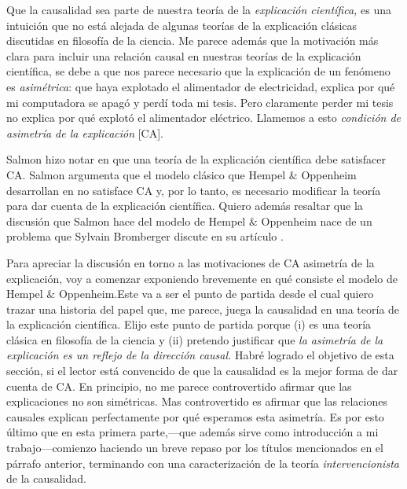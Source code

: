 Que la causalidad sea parte de nuestra teoría de la
\emph{explicación científica,} es una intuición que no
está alejada de algunas teorías de la explicación
clásicas discutidas en filosofía de la ciencia. Me
parece además que la motivación más clara para incluir
una relación causal en nuestras teorías de la
explicación científica, se debe a que nos parece
necesario que la explicación de un fenómeno es \emph{
asimétrica}: que haya explotado el alimentador de
electricidad, explica por qué mi computadora se apagó
y perdí toda mi tesis. Pero claramente perder mi tesis
no explica por qué explotó el alimentador eléctrico.
Llamemos a esto \emph{condición de asimetría de la
explicación} [CA].

Salmon hizo notar en  que una teoría
de la explicación científica debe satisfacer CA. Salmon
argumenta que el modelo clásico que Hempel $\&$ Oppenheim
desarrollan en  no satisface CA y, por
lo tanto, es necesario modificar la teoría para dar cuenta
de la explicación científica. Quiero además resaltar que la
discusión que Salmon hace del modelo de Hempel $\&$
Oppenheim nace de un problema que  Sylvain Bromberger discute 
en su artículo .

Para apreciar la discusión en torno a las motivaciones de CA
asimetría de la explicación, voy a comenzar exponiendo
brevemente en qué consiste el modelo de Hempel $\&$
Oppenheim.Este va a ser el punto de partida desde el cual
quiero trazar una historia del papel que, me parece, juega
la causalidad en una teoría de la explicación científica.
Elijo este punto de partida porque (i) es una teoría clásica
en filosofía de la ciencia y (ii) pretendo justificar que
\emph{la asimetría de la explicación es un reflejo de la
dirección causal.} Habré logrado el objetivo de esta
sección, si el lector está convencido de que la causalidad
es la mejor forma de dar cuenta de CA. 
En principio, no me parece controvertido afirmar que las
explicaciones no son simétricas. Mas controvertido es
afirmar que las relaciones causales explican perfectamente
por qué esperamos esta asimetría. Es por esto último que
en esta primera parte,---que además sirve como introducción
a mi trabajo---comienzo haciendo un breve repaso por los
títulos mencionados en el párrafo anterior, terminando con
una caracterización de la teoría \emph{intervencionista} de
la causalidad.


